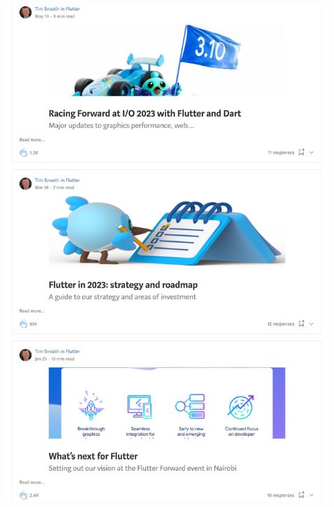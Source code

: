 \Continuing
\begin{center}
    \includegraphics[width=33em]{flutter-article-claps-p2}
\end{center}
\WillContinue
\pagebreak

